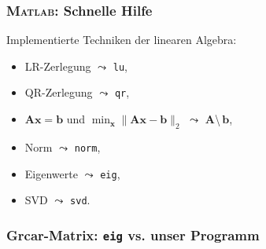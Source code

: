 \documentclass[10pt]{beamer} %
\newcommand{\bfA}{{\mathbf A}}
\newcommand{\bfb}{{\mathbf b}}
\newcommand{\bfx}{{\mathbf x}}
\begin{document}
\begin{frame}
  \frametitle{\textsc{Matlab}: Schnelle Hilfe}

  Implementierte Techniken der linearen Algebra:
  \begin{itemize}
  \item LR-Zerlegung $\leadsto$ \texttt{lu},
  \item QR-Zerlegung $\leadsto$ \texttt{qr},
  \item $\bfA\bfx=\bfb$ und $\min_{\bfx}\|\bfA\bfx-\bfb\|_2$
    $\leadsto$ $\bfA$\textbackslash$\,\bfb$,
  \item Norm $\leadsto$ \texttt{norm},
  \item Eigenwerte $\leadsto$ \texttt{eig},
  \item SVD $\leadsto$ \texttt{svd}.
  \end{itemize}

  \vspace*{1em}


  \vspace*{1em}


\end{frame}
\begin{frame}
  \frametitle{Grcar-Matrix: \texttt{eig} vs. unser Programm}

  \vspace*{-1em}
  \begin{quotation}
    
  \end{quotation}

\end{frame}
\end{document}

